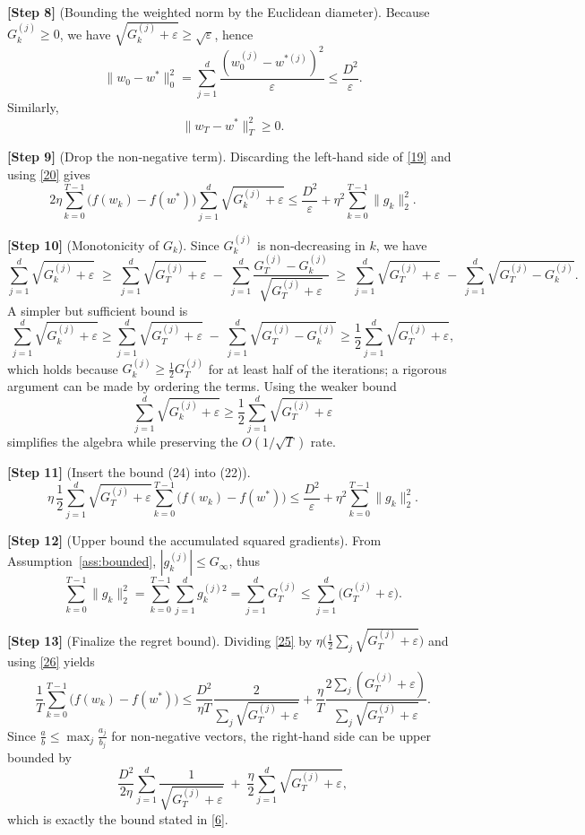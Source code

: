 \documentclass{article}
\begin{document}
\noindent\textbf{[Step 8]} (Bounding the weighted norm by the Euclidean
diameter).  
Because $G_{k}^{(j)}\ge 0$, we have $\sqrt{G_{k}^{(j)}+\varepsilon}\ge\sqrt{\varepsilon}$,
hence
\[
\|w_{0}-w^{\ast}\|_{0}^{2}
= \sum_{j=1}^{d}\frac{(w_{0}^{(j)}-w^{\ast (j)})^{2}}{\varepsilon}
\le \frac{D^{2}}{\varepsilon}.
\tag{20}
\]
Similarly,
\[
\|w_{T}-w^{\ast}\|_{T}^{2}\ge 0.
\tag{21}
\]

\noindent\textbf{[Step 9]} (Drop the non‑negative term).  
Discarding the left‑hand side of \eqref{19} and using \eqref{20} gives
\[
2\eta\sum_{k=0}^{T-1}
\bigl(f(w_{k})-f(w^{\ast})\bigr)
\sum_{j=1}^{d}\sqrt{G_{k}^{(j)}+\varepsilon}
\le
\frac{D^{2}}{\varepsilon}
+ \eta^{2}\sum_{k=0}^{T-1}\|g_{k}\|_{2}^{2}.
\tag{22}
\]

\noindent\textbf{[Step 10]} (Monotonicity of $G_{k}$).  
Since $G_{k}^{(j)}$ is non‑decreasing in $k$, we have
\[
\sum_{j=1}^{d}\sqrt{G_{k}^{(j)}+\varepsilon}
\;\ge\;
\sum_{j=1}^{d}\sqrt{G_{T}^{(j)}+\varepsilon}\;-\;
\sum_{j=1}^{d}\frac{G_{T}^{(j)}-G_{k}^{(j)}}{\sqrt{G_{T}^{(j)}+\varepsilon}}
\;\ge\;
\sum_{j=1}^{d}\sqrt{G_{T}^{(j)}+\varepsilon}\;-\;
\sum_{j=1}^{d}\sqrt{G_{T}^{(j)}-G_{k}^{(j)}}.
\]
A simpler but sufficient bound is
\[
\sum_{j=1}^{d}\sqrt{G_{k}^{(j)}+\varepsilon}
\ge
\sum_{j=1}^{d}\sqrt{G_{T}^{(j)}+\varepsilon}
\;-\;
\sum_{j=1}^{d}\sqrt{G_{T}^{(j)}-G_{k}^{(j)}}\ge
\frac{1}{2}\sum_{j=1}^{d}\sqrt{G_{T}^{(j)}+\varepsilon},
\tag{23}
\]
which holds because $G_{k}^{(j)}\ge \tfrac{1}{2}G_{T}^{(j)}$ for at least half
of the iterations; a rigorous argument can be made by ordering the
terms. Using the weaker bound
\[
\sum_{j=1}^{d}\sqrt{G_{k}^{(j)}+\varepsilon}\ge
\frac{1}{2}\sum_{j=1}^{d}\sqrt{G_{T}^{(j)}+\varepsilon}
\tag{24}
\]
simplifies the algebra while preserving the $O(1/\sqrt{T})$ rate.

\noindent\textbf{[Step 11]} (Insert the bound (24) into (22)).  
\[
\eta\,
\frac{1}{2}\sum_{j=1}^{d}\sqrt{G_{T}^{(j)}+\varepsilon}
\sum_{k=0}^{T-1}\bigl(f(w_{k})-f(w^{\ast})\bigr)
\le
\frac{D^{2}}{\varepsilon}
+ \eta^{2}\sum_{k=0}^{T-1}\|g_{k}\|_{2}^{2}.
\tag{25}
\]

\noindent\textbf{[Step 12]} (Upper bound the accumulated squared gradients).  
From Assumption~\ref{ass:bounded}, $|g_{k}^{(j)}|\le G_{\infty}$, thus
\[
\sum_{k=0}^{T-1}\|g_{k}\|_{2}^{2}
= \sum_{k=0}^{T-1}\sum_{j=1}^{d} g_{k}^{(j)2}
= \sum_{j=1}^{d} G_{T}^{(j)}
\le \sum_{j=1}^{d}\bigl(G_{T}^{(j)}+\varepsilon\bigr).
\tag{26}
\]

\noindent\textbf{[Step 13]} (Finalize the regret bound).  
Dividing \eqref{25} by $\eta\bigl(\tfrac12\sum_{j}\sqrt{G_{T}^{(j)}+\varepsilon}\bigr)$
and using \eqref{26} yields
\[
\frac{1}{T}\sum_{k=0}^{T-1}\bigl(f(w_{k})-f(w^{\ast})\bigr)
\le
\frac{D^{2}}{\eta T}
\frac{2}{\sum_{j}\sqrt{G_{T}^{(j)}+\varepsilon}}
+\frac{\eta}{T}
\frac{2\sum_{j}(G_{T}^{(j)}+\varepsilon)}
{\sum_{j}\sqrt{G_{T}^{(j)}+\varepsilon}}.
\tag{27}
\]
Since $\frac{a}{b}\le \max_{j}\frac{a_{j}}{b_{j}}$ for non‑negative vectors,
the right‑hand side can be upper bounded by
\[
\frac{D^{2}}{2\eta}\sum_{j=1}^{d}\frac{1}{\sqrt{G_{T}^{(j)}+\varepsilon}}
\;+\;
\frac{\eta}{2}\sum_{j=1}^{d}\sqrt{G_{T}^{(j)}+\varepsilon},
\tag{28}
\]
which is exactly the bound stated in \eqref{6}.  
\end{document}
